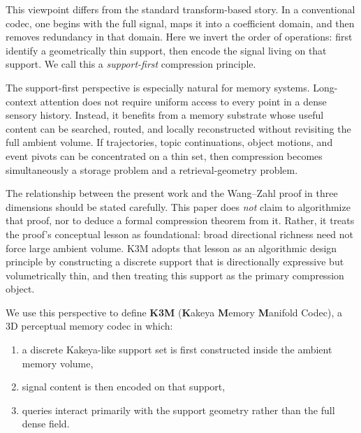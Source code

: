\documentclass[11pt]{article}
\begin{document}
This viewpoint differs from the standard transform-based story. In a conventional codec, one begins with the full signal, maps it into a coefficient domain, and then removes redundancy in that domain. Here we invert the order of operations: first identify a geometrically thin support, then encode the signal living on that support. We call this a \emph{support-first} compression principle.

The support-first perspective is especially natural for memory systems. Long-context attention does not require uniform access to every point in a dense sensory history. Instead, it benefits from a memory substrate whose useful content can be searched, routed, and locally reconstructed without revisiting the full ambient volume. If trajectories, topic continuations, object motions, and event pivots can be concentrated on a thin set, then compression becomes simultaneously a storage problem and a retrieval-geometry problem.

The relationship between the present work and the Wang--Zahl proof in three dimensions \cite{wangzahl2025} should be stated carefully. This paper does \emph{not} claim to algorithmize that proof, nor to deduce a formal compression theorem from it. Rather, it treats the proof's conceptual lesson as foundational: broad directional richness need not force large ambient volume. K3M adopts that lesson as an algorithmic design principle by constructing a discrete support that is directionally expressive but volumetrically thin, and then treating this support as the primary compression object.

We use this perspective to define \textbf{K3M} (\textbf{K}akeya \textbf{M}emory \textbf{M}anifold Codec), a 3D perceptual memory codec in which:
\begin{enumerate}[leftmargin=1.5em]
\item a discrete Kakeya-like support set is first constructed inside the ambient memory volume,
\item signal content is then encoded on that support,
\item queries interact primarily with the support geometry rather than the full dense field.
\end{enumerate}
\end{document}
